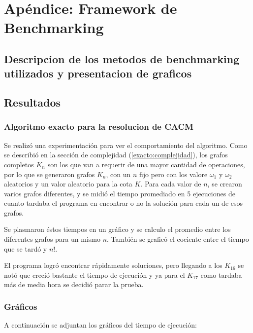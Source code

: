 \section{Ap\'endice: Framework de Benchmarking} \label{casos_de_prueba}
\subsection{Descripcion de los metodos de benchmarking utilizados y presentacion de graficos}
\subsection{Resultados}
\subsubsection{Algoritmo exacto para la resolucion de CACM}

Se realiz\'o una experimentaci\'on para ver el comportamiento del algoritmo. Como se describi\'o en la secci\'on de complejidad (\ref{exacto:complejidad}), los grafos completos $K_n$ son los que van a requerir de una mayor cantidad de operaciones,
por lo que se generaron grafos $K_n$, con un $n$ fijo pero con los valore $\omega_1$ y $\omega_2$ aleatorios y un valor aleatorio para la cota $K$.
Para cada valor de $n$, se crearon varios grafos diferentes, y se midi\'o el tiempo promediado en 5 ejecuciones de cuanto tardaba el programa en encontrar o no la soluci\'on para cada un de esos grafos.

Se plasmaron \'estos tiempos en un gr\'afico y se calculo el promedio entre los diferentes grafos para un mismo $n$. Tambi\'en se grafic\'o el cociente entre el tiempo que se tard\'o y $n!$.

El programa logr\'o encontrar r\'apidamente soluciones, pero llegando a los $K_{16}$ se not\'o que creci\'o bastante el tiempo de ejecuci\'on y ya para el $K_{17}$ como tardaba m\'as de media hora se decidi\'o parar la prueba.

\subsubsection{Gr\'aficos}
A continuaci\'on se adjuntan los gr\'aficos del tiempo de ejecuci\'on:

